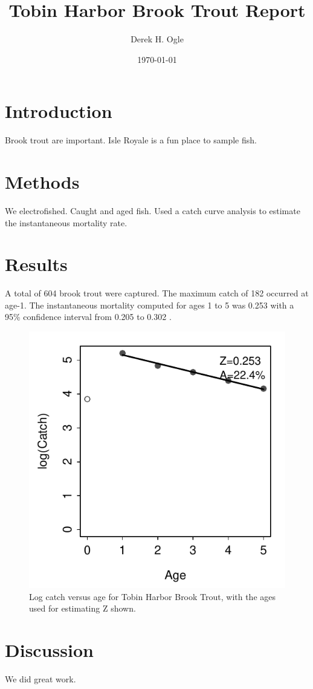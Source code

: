 \documentclass{article}\usepackage[]{graphicx}\usepackage[]{color}
\newenvironment{knitrout}{}{} %
\begin{document}
  \title{Tobin Harbor Brook Trout Report}
  \author{\vspace{-12pt}Derek H. Ogle}
  \date{\vspace{-12pt}\today}
  \maketitle



\section*{Introduction}
Brook trout are important.  Isle Royale is a fun place to sample fish.

\section*{Methods}
We electrofished.  Caught and aged fish.  Used a catch curve analysis to estimate the instantaneous mortality rate.

\section*{Results}


A total of 604 brook trout were captured.  The maximum catch of 182 occurred at age-1.  The instantaneous mortality computed for ages 1 to 5 was 0.253 with a 95\% confidence interval from 0.205 to 0.302 .

\begin{knitrout}
\color{fgcolor}\begin{figure}[h]

{\centering \includegraphics[width=.4\linewidth]{Figs/CatchCurve-1} 

}

\caption[Log catch versus age for Tobin Harbor Brook Trout, with the ages used for estimating Z shown]{Log catch versus age for Tobin Harbor Brook Trout, with the ages used for estimating Z shown.}\label{fig:CatchCurve}
\end{figure}


\end{knitrout}

\section*{Discussion}
We did great work.
\end{document}
